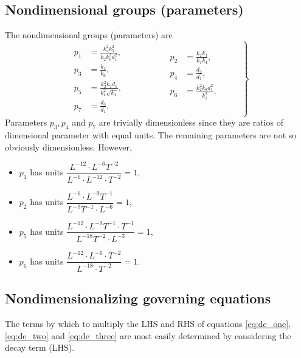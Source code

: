 \documentclass[10pt,letterpaper]{article}
\begin{document}
\subsection{Nondimensional groups (parameters)}
The nondimensional groups (parameters) are
\begin{equation}\label{eq:parameters}
\left.
\begin{gathered}\begin{aligned}
p_1 &= \frac{k_4^2 k_5^2}{k_2 k_6^2 d_1^2},  \\
p_3 &= \frac{k_4}{k_6}, \\
p_5 &= \frac{k_2^2 k_7 d_1}{k_1^2 \sqrt{k_4}}, \\
p_7 &= \frac{d_3}{d_1}.
\end{aligned}\end{gathered}
\qquad \qquad
\begin{gathered}\begin{aligned}
p_2 &= \frac{k_2 k_3}{k_1 k_4}, \\
p_4 &= \frac{d_2}{d_1}, \\
p_6 &= \frac{k_2^2 k_8 d_1^2}{k_1^2}, \\
& \\
\end{aligned}\end{gathered}
\qquad \right \}
\end{equation}
Parameters $p_3, p_4$ and $p_7$ are trivially dimensionless  since they are ratios of dimensional parameter with equal units. The remaining parameters are not so obviously dimensionless. However,
\begin{itemize}
  \item $p_1$ has units $\dfrac{L^{-12}\cdot L^{-6}T^{-2}}  {L^{-6} \cdot L^{-12} \cdot T^{-2}} = 1$,
  \item $p_2$ has units $\dfrac{L^{-6} \cdot L^{-9}T^{-1}}  {L^{-9} T^{-1} \cdot L^{-6}} = 1$,
  \item $p_5$ has units $\dfrac{L^{-12}\cdot L^{-9}T^{-1} \cdot T^{-1} }  {L^{-18} T^{-2} \cdot L^{-3}} = 1$,
  \item $p_6$ has units $\dfrac{L^{-12}\cdot L^{-6} \cdot T^{-2}}  {L^{-18}\cdot T^{-2}} = 1$.
\end{itemize}


\subsection{Nondimensionalizing governing equations}

The terms by which to multiply the LHS and RHS of equations \ref{eq:de_one}, \ref{eq:de_two} and \ref{eq:de_three} are most easily determined by considering the decay term (LHS).
\end{document}
